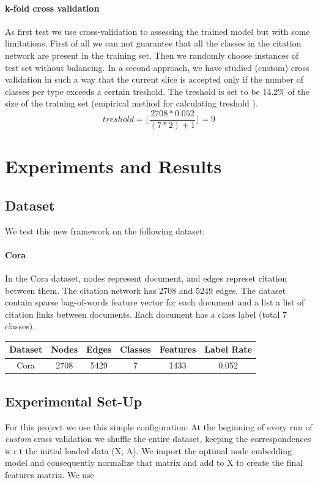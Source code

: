 \documentclass{report}
\begin{document}
\paragraph{k-fold cross validation}
As first test we use cross-validation to assessing the trained model but with some limitations. First of all we can not guarantee that all the classes in the citation network are present in the training set. Then we randomly choose instances of test set without balancing. 
In a second approach, we have studied (custom) cross validation in such a way that the current slice is accepted only if the number of classes per type exceeds a certain treshold. The treshold is set to be 14.2\% of the size of the training set (empirical method for calculating treshold
 ).
\[
treshold = \lfloor \dfrac{2708*0.052}{(7*2) + 1} \rfloor = 9 
\]


\section{Experiments and Results}

\subsection{Dataset}
We test this new framework on the following dataset:
\paragraph{Cora} In the Cora dataset, nodes represent document, and edges represet citation between them. The citation network has  2708 and 5249 edges. The dataset contain sparse bag-of-words feature vector for each document and a list a list of citation links between documents. Each document has a class label (total 7  classes). 
\begin{table}[htb]
\centering

\begin{tabular}{|c|c|c|c|c|c|}
\toprule
Dataset & Nodes & Edges & Classes & Features & Label Rate \\ \midrule
Cora    &  2708   & 5429    &  7   &  1433 & 0.052   \\
\end{tabular}
\end{table}

\subsection{Experimental Set-Up}
For this project we use this simple configuration:
At the beginning of every run of \textit{custom} cross validation we shuffle the entire dataset, keeping the correspondences w.r.t the initial loaded data (X, A).
We import the optimal node embedding model and consequently normalize that matrix and add to X to create the final features matrix. We use
\end{document}
